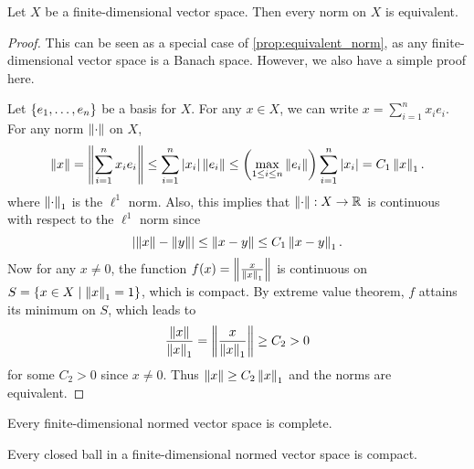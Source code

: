 \begin{proposition}
    Let $X$ be a finite-dimensional vector space. Then every norm on 
    $X$ is equivalent.
\end{proposition}
\begin{proof}
    This can be seen as a special case of \cref{prop:equivalent_norm}, as any 
    finite-dimensional vector space is a Banach space. However, we also have a
    simple proof here. 

    Let $\left\{ {e_1,\ldots,e_n} \right\}$ be a basis for $X$. For any $x\in X$, we can write 
    $x = \sum_{i=1}^n x_ie_i$. For any norm $\left\lVert {\cdot} \right\rVert$ on $X$, 
    \begin{equation*}
        \norm{x} = \norm{\sum_{i=1}^n x_ie_i} \leq \sum_{i=1}^n \abs{x_i}\norm{e_i} 
        \leq \pth{\max_{1\leq i\leq n}\norm{e_i}}\sum_{i=1}^n\abs{x_i} = C_1\norm{x}_1.
    \end{equation*}
    where $\left\lVert {\cdot} \right\rVert_1$ is the $\ell^1$ norm. Also, this implies that 
    $\left\lVert {\cdot} \right\rVert:X\to\mathbb{R}$ is continuous with respect to the $\ell^1$ norm since 
    \begin{equation*}
        \left\lvert {\left\lVert {x} \right\rVert - \left\lVert {y} \right\rVert} \right\rvert \leq \left\lVert {x-y} \right\rVert \leq C_1\left\lVert {x-y} \right\rVert_1.
    \end{equation*}
    Now for any $x\neq 0$, the function $f(x) = \left\lVert {\frac{x}{\left\lVert {x} \right\rVert_1}} \right\rVert$ is 
    continuous on $S = \left\{ x\in X \;\middle\vert\; \left\lVert {x} \right\rVert_1 = 1 \right\}$, which is compact. 
    By extreme value theorem, $f$ attains its minimum on $S$, which leads to 
    \begin{equation*}
        \frac{\left\lVert {x} \right\rVert}{\left\lVert {x} \right\rVert_1} = \left\lVert {\frac{x}{\left\lVert {x} \right\rVert_1}} \right\rVert \geq C_2 > 0
    \end{equation*}
    for some $C_2 > 0$ since $x\neq 0$. Thus $\left\lVert {x} \right\rVert \geq C_2\left\lVert {x} \right\rVert_1$ and 
    the norms are equivalent.
\end{proof}

\begin{remark}
    Every finite-dimensional normed vector space is complete.
\end{remark}

\begin{remark}
    Every closed ball in a finite-dimensional normed vector space is compact.
\end{remark}

